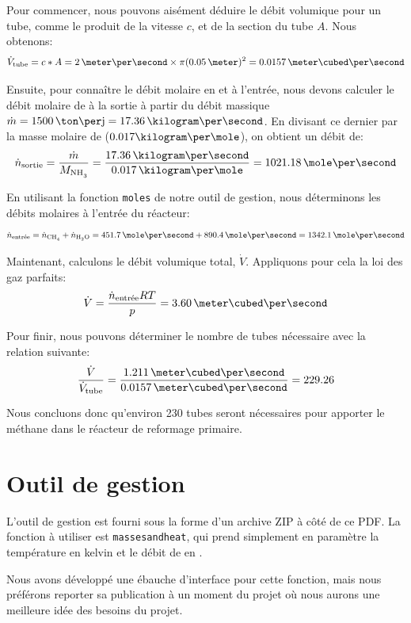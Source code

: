 Pour commencer, nous pouvons aisément déduire le débit volumique pour un tube,
comme le produit de la vitesse $c$, et de la section du tube $A$.
Nous obtenons:
\begin{equation*}
\dot{V}\ind{tube} = c*A = 2\,\meter\per\second \times \pi(0.05\,\meter)^2
= 0.0157\,\meter\cubed\per\second
\end{equation*}

Ensuite, pour connaître le débit molaire en  et  à l'entrée, nous devons calculer le débit molaire de  à la sortie
à partir du débit massique $\dot{m} = 1500\,\ton\per\jour = 17.36\,\kilogram\per\second$.
En divisant ce dernier par la masse molaire de  ($0.017\kilogram\per\mole$),
on obtient un débit de:
\begin{equation*}
\dot{n}\ind{sortie} = \frac{\dot{m}}{M_{\ce{NH3}}}
= \frac{17.36\,\kilogram\per\second}{0.017\,\kilogram\per\mole}
= 1021.18\,\mole\per\second
\end{equation*}

En utilisant la fonction \texttt{moles} de notre outil de gestion,
nous déterminons les débits molaires à l'entrée du réacteur:
\begin{equation*}
\dot{n}\ind{entrée} =  \dot{n}\ind{\ce{CH4}}+ \dot{n}\ind{\ce{H2O}}=451.7\,\mole\per\second + 890.4\,\mole\per\second = 1342.1 \,\mole\per\second
\end{equation*}

Maintenant, calculons le débit volumique total, $\dot{V}$.
Appliquons pour cela la loi des gaz parfaits:
\begin{equation*}
\dot{V} = \frac{\dot{n}\ind{entrée}RT}{p} = 3.60\,\meter\cubed\per\second
\end{equation*}

Pour finir, nous pouvons déterminer
le nombre de tubes nécessaire avec la relation suivante:
\begin{equation*}
\frac{\dot{V}}{\dot{V}\ind{tube}}
= \frac{1.211\,\meter\cubed\per\second}{0.0157\,\meter\cubed\per\second} = 229.26
\end{equation*}

Nous concluons donc qu'environ 230 tubes seront nécessaires pour apporter le méthane
dans le réacteur de reformage primaire.

\section{Outil de gestion}

L'outil de gestion est fourni sous la forme d'un archive ZIP à côté de ce PDF.
La fonction à utiliser est \texttt{masses\textunderscore and\textunderscore heat},
qui prend simplement en paramètre la température en kelvin et le débit
de  en \kilogram\per\second.

Nous avons développé une ébauche d'interface pour cette fonction,
mais nous préférons reporter sa publication à un moment du projet où nous aurons
une meilleure idée des besoins du projet.
